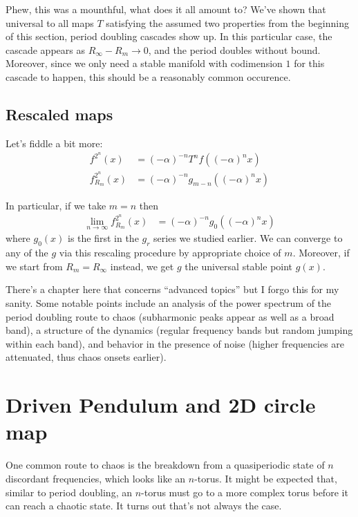 \documentclass[12pt]{article}
\begin{document}
Phew, this was a mounthful, what does it all amount to? We've shown that
universal to all maps $T$ satisfying the assumed two properties from the
beginning of this section, period doubling cascades show up. In this particular
case, the cascade appears as $R_\infty - R_m \to 0$, and the period doubles
without bound. Moreover, since we only need a stable manifold with codimension
$1$ for this cascade to happen, this should be a reasonably common occurence.

\subsection{Rescaled maps}

Let's fiddle a bit more:
\begin{align}
    f^{2^n}(x) &= \left( -\alpha \right)^{-n} T^n f\left( (-\alpha)^nx \right)\\
    f^{2^n}_{R_m}(x) &= (-\alpha)^{-n}g_{m-n}\left( (-\alpha)^nx \right)
\end{align}

In particular, if we take $m=n$ then
\begin{align}
    \lim_{n \to \infty} f^{2^n}_{R_m}(x) &= (-\alpha)^{-n}g_0((-\alpha)^nx)
\end{align}
where $g_0(x)$ is the first in the $g_r$ series we studied earlier. We can
converge to any of the $g$ via this rescaling procedure by appropriate choice of
$m$. Moreover, if we start from $R_m = R_\infty$ instead, we get $g$ the
universal stable point $g(x)$.

There's a chapter here that concerns ``advanced topics'' but I forgo this for my
sanity. Some notable points include an analysis of the power spectrum of the
period doubling route to chaos (subharmonic peaks appear as well as a broad
band), a structure of the dynamics (regular frequency bands but random jumping
within each band), and behavior in the presence of noise (higher frequencies are
attenuated, thus chaos onsets earlier).

\clearpage

\section{Driven Pendulum and 2D circle map}

One common route to chaos is the breakdown from a quasiperiodic state of $n$
discordant frequencies, which looks like an $n$-torus. It might be expected
that, similar to period doubling, an $n$-torus must go to a more complex torus
before it can reach a chaotic state. It turns out that's not always the case.
\end{document}
